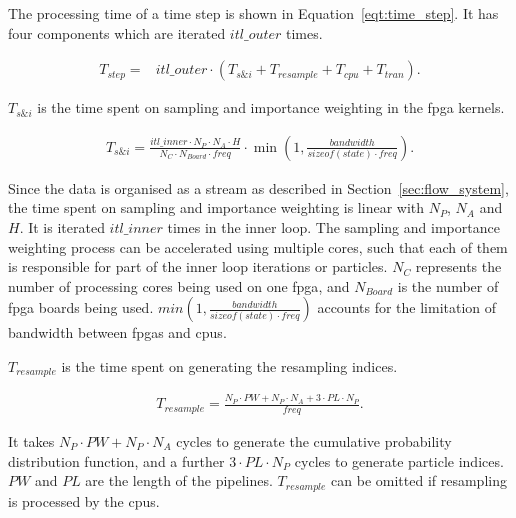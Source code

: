 The processing time of a time step is shown in Equation~\ref{eqt:time_step}.
It has four components which are iterated $itl\_outer$ times.

\begin{equation}
\begin{aligned}
T_{step} = & itl\_outer \cdot \left (T_{s\&i} + T_{resample} + T_{cpu} + T_{tran} \right) \mbox{.}
\end{aligned}
\label{eqt:time_step}
\end{equation}
 
$T_{s\&i}$ is the time spent on sampling and importance weighting in the \gls{fpga} kernels.

\begin{equation}
\begin{aligned}
T_{s\&i} = \frac{itl\_inner \cdot N_P \cdot N_A \cdot H}{N_C \cdot N_{Board} \cdot freq} \cdot \min\left(1,\frac{bandwidth}{sizeof(state) \cdot freq}\right) \mbox{.}
\end{aligned}
\end{equation}

Since the data is organised as a stream as described in Section~\ref{sec:flow_system}, the time spent on sampling and importance weighting is linear with $N_P$, $N_A$ and $H$.
It is iterated $itl\_inner$ times in the inner loop.
The sampling and importance weighting process can be accelerated using multiple cores, such that each of them is responsible for part of the inner loop iterations or particles.
$N_C$ represents the number of processing cores being used on one \gls{fpga}, and $N_{Board}$ is the number of \gls{fpga} boards being used.
$min(1,\frac{bandwidth}{sizeof(state) \cdot freq})$ accounts for the limitation of bandwidth between \glspl{fpga} and \glspl{cpu}.

$T_{resample}$ is the time spent on generating the resampling indices.

\begin{equation}
\begin{aligned}
T_{resample} = \frac{N_P \cdot PW + N_P \cdot N_A + 3 \cdot PL \cdot N_P}{freq} \mbox{.}
\end{aligned}
\end{equation}

It takes $N_P \cdot PW + N_P \cdot N_A$ cycles to generate the cumulative probability distribution function, and a further $3 \cdot PL \cdot N_P$ cycles to generate particle indices.
$PW$ and $PL$ are the length of the pipelines.
$T_{resample}$ can be omitted if resampling is processed by the \glspl{cpu}.

